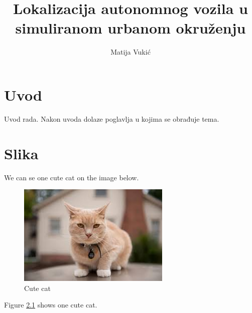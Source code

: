 \documentclass[times, utf8, diplomski]{fer}
\begin{document}

\title{Lokalizacija autonomnog vozila u simuliranom urbanom okruženju}

\author{Matija Vukić}

\maketitle

\izvornik


\tableofcontents

\chapter{Uvod}
Uvod rada. Nakon uvoda dolaze poglavlja u kojima se obrađuje tema.

\chapter{Slika}
We can se one cute cat on the image below.
\begin{figure}[ht!]
  \centering
  \includegraphics{images/cat.jpg}
  \caption{Cute cat}
  \label{fig:cute_cat}
\end{figure}

Figure \ref{fig:cute_cat} shows one cute cat.
\end{document}

